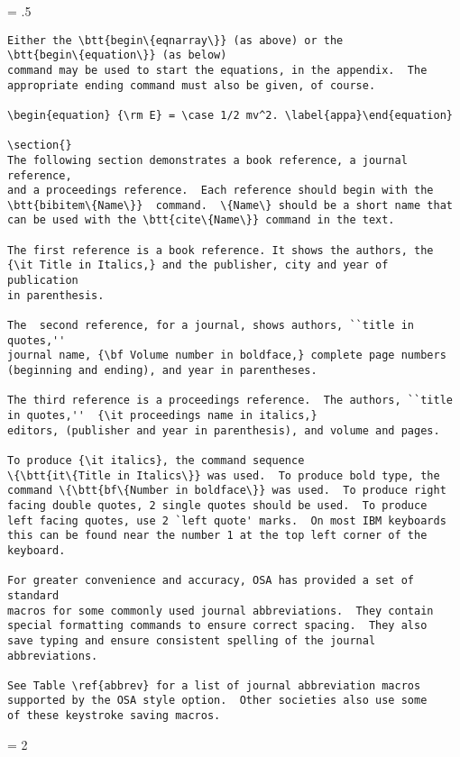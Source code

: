 \newpage
\baselineskip = .5\baselineskip  %
\begin{verbatim}
Either the \btt{begin\{eqnarray\}} (as above) or the
\btt{begin\{equation\}} (as below)
command may be used to start the equations, in the appendix.  The
appropriate ending command must also be given, of course.

\begin{equation} {\rm E} = \case 1/2 mv^2. \label{appa}\end{equation}

\section{}
The following section demonstrates a book reference, a journal reference,
and a proceedings reference.  Each reference should begin with the
\btt{bibitem\{Name\}}  command.  \{Name\} should be a short name that
can be used with the \btt{cite\{Name\}} command in the text.

The first reference is a book reference. It shows the authors, the
{\it Title in Italics,} and the publisher, city and year of publication
in parenthesis.

The  second reference, for a journal, shows authors, ``title in quotes,''
journal name, {\bf Volume number in boldface,} complete page numbers
(beginning and ending), and year in parentheses.

The third reference is a proceedings reference.  The authors, ``title
in quotes,''  {\it proceedings name in italics,}
editors, (publisher and year in parenthesis), and volume and pages.

To produce {\it italics}, the command sequence
\{\btt{it\{Title in Italics\}} was used.  To produce bold type, the
command \{\btt{bf\{Number in boldface\}} was used.  To produce right
facing double quotes, 2 single quotes should be used.  To produce
left facing quotes, use 2 `left quote' marks.  On most IBM keyboards
this can be found near the number 1 at the top left corner of the
keyboard.

For greater convenience and accuracy, OSA has provided a set of standard
macros for some commonly used journal abbreviations.  They contain
special formatting commands to ensure correct spacing.  They also
save typing and ensure consistent spelling of the journal abbreviations.

See Table \ref{abbrev} for a list of journal abbreviation macros
supported by the OSA style option.  Other societies also use some
of these keystroke saving macros.

\end{verbatim} \newpage
\baselineskip = 2\baselineskip  %



